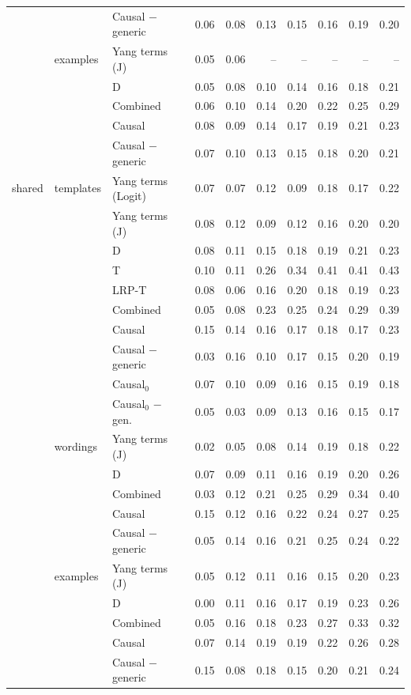 \begin{tabular}{@{}lllrrrrrrr@{}}
 &  & Causal $-$ generic & 0.06 & 0.08 & 0.13 & 0.15 & 0.16 & 0.19 & 0.20 \\
 & examples & Yang terms (J) & 0.05 & 0.06 & -- & -- & -- & -- & -- \\
 &  & D & 0.05 & 0.08 & 0.10 & 0.14 & 0.16 & 0.18 & 0.21 \\
 &  & Combined & 0.06 & 0.10 & 0.14 & 0.20 & 0.22 & 0.25 & 0.29 \\
 &  & Causal & 0.08 & 0.09 & 0.14 & 0.17 & 0.19 & 0.21 & 0.23 \\
 &  & Causal $-$ generic & 0.07 & 0.10 & 0.13 & 0.15 & 0.18 & 0.20 & 0.21 \\
\addlinespace
shared & templates & Yang terms (Logit) & 0.07 & 0.07 & 0.12 & 0.09 & 0.18 & 0.17 & 0.22 \\
 &  & Yang terms (J) & 0.08 & 0.12 & 0.09 & 0.12 & 0.16 & 0.20 & 0.20 \\
 &  & D & 0.08 & 0.11 & 0.15 & 0.18 & 0.19 & 0.21 & 0.23 \\
 &  & T & 0.10 & 0.11 & 0.26 & 0.34 & 0.41 & 0.41 & 0.43 \\
 &  & LRP-T & 0.08 & 0.06 & 0.16 & 0.20 & 0.18 & 0.19 & 0.23 \\
 &  & Combined & 0.05 & 0.08 & 0.23 & 0.25 & 0.24 & 0.29 & 0.39 \\
 &  & Causal & 0.15 & 0.14 & 0.16 & 0.17 & 0.18 & 0.17 & 0.23 \\
 &  & Causal $-$ generic & 0.03 & 0.16 & 0.10 & 0.17 & 0.15 & 0.20 & 0.19 \\
 &  & Causal$_0$ & 0.07 & 0.10 & 0.09 & 0.16 & 0.15 & 0.19 & 0.18 \\
 &  & Causal$_0$ $-$ gen. & 0.05 & 0.03 & 0.09 & 0.13 & 0.16 & 0.15 & 0.17 \\
 & wordings & Yang terms (J) & 0.02 & 0.05 & 0.08 & 0.14 & 0.19 & 0.18 & 0.22 \\
 &  & D & 0.07 & 0.09 & 0.11 & 0.16 & 0.19 & 0.20 & 0.26 \\
 &  & Combined & 0.03 & 0.12 & 0.21 & 0.25 & 0.29 & 0.34 & 0.40 \\
 &  & Causal & 0.15 & 0.12 & 0.16 & 0.22 & 0.24 & 0.27 & 0.25 \\
 &  & Causal $-$ generic & 0.05 & 0.14 & 0.16 & 0.21 & 0.25 & 0.24 & 0.22 \\
 & examples & Yang terms (J) & 0.05 & 0.12 & 0.11 & 0.16 & 0.15 & 0.20 & 0.23 \\
 &  & D & 0.00 & 0.11 & 0.16 & 0.17 & 0.19 & 0.23 & 0.26 \\
 &  & Combined & 0.05 & 0.16 & 0.18 & 0.23 & 0.27 & 0.33 & 0.32 \\
 &  & Causal & 0.07 & 0.14 & 0.19 & 0.19 & 0.22 & 0.26 & 0.28 \\
 &  & Causal $-$ generic & 0.15 & 0.08 & 0.18 & 0.15 & 0.20 & 0.21 & 0.24 \\
\bottomrule
\end{tabular}
